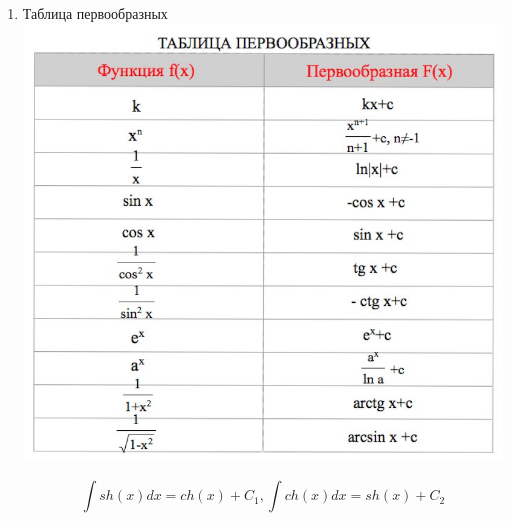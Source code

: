 \documentclass[a4paper]{article}
\theoremstyle{definition}
\newtheorem*{comment}{Замечание}
\numberwithin{theorem}{subsection}
\numberwithin{lemma}{subsection}
\numberwithin{definition}{subsection}
\numberwithin{comment*}{subsection}
\numberwithin{consequence}{subsection}
\numberwithin{property}{subsection}
\begin{document}
\begin{enumerate}

 \item Таблица первообразных\\
       \includegraphics{pervoobraz}

       $$\int sh(x)dx = ch(x)+C_1, \int ch(x)dx = sh(x)+C_2$$


\end{enumerate}
\end{document}
